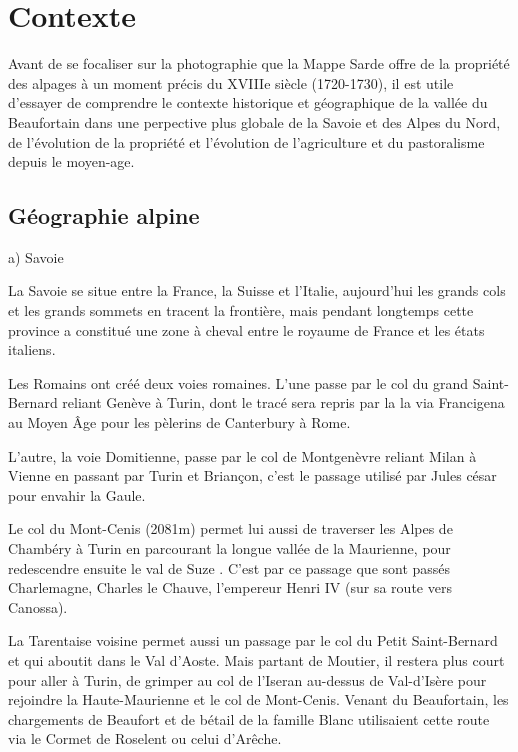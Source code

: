 \documentclass[12pt,a4paper]{report}
\begin{document}
	
	
	
\chapter{Contexte}
	
	Avant de se focaliser sur la photographie que la Mappe Sarde offre de la propriété des alpages à un moment précis du XVIIIe siècle (1720-1730), il est utile d'essayer de comprendre le contexte historique et géographique de la vallée du Beaufortain dans une perpective plus globale de la Savoie et des Alpes du Nord, de l'évolution de la propriété  et  l'évolution de l'agriculture et du pastoralisme depuis le moyen-age.
	
\section{Géographie alpine}

a)	Savoie

La Savoie  se situe entre la France, la Suisse et l'Italie, aujourd'hui les grands cols et les grands sommets en tracent la frontière, mais pendant longtemps cette province a constitué une zone à cheval entre le royaume de France et les états italiens.

Les Romains ont créé deux voies romaines. L'une passe par le col du grand Saint-Bernard reliant Genève à Turin, dont le tracé sera repris par la la via Francigena au Moyen Âge pour les pèlerins de Canterbury à Rome.

L'autre, la voie Domitienne, passe par le col de Montgenèvre reliant Milan à Vienne en passant par Turin et Briançon, c'est le passage utilisé par Jules césar pour envahir la Gaule.

Le col du Mont-Cenis (2081m) permet lui aussi de traverser les Alpes de Chambéry à Turin en parcourant la longue vallée de la Maurienne, pour redescendre ensuite le val de Suze . C'est par ce passage que sont passés Charlemagne, Charles le Chauve, l'empereur Henri IV (sur sa route vers Canossa).

La Tarentaise voisine permet aussi un passage par le col du Petit Saint-Bernard et qui aboutit dans le Val d'Aoste. Mais partant de Moutier, il restera plus court pour aller à Turin, de grimper au col de l'Iseran au-dessus de Val-d'Isère pour rejoindre la Haute-Maurienne et le col de Mont-Cenis. Venant du Beaufortain, les chargements de Beaufort et de bétail de la famille Blanc utilisaient cette route via le Cormet de Roselent ou celui d'Arêche.
\end{document}
